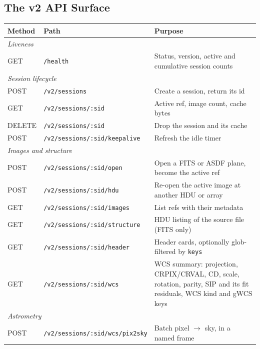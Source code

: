 \documentclass[11pt,a4paper]{article}
\newcommand{\code}[1]{\texttt{\small #1}}
\begin{document}
    \subsection{The v2 API Surface}

    \begin{table}[H]
        \centering
        \small
        \begin{tabularx}{\textwidth}{llX}
            \toprule
            \textbf{Method} & \textbf{Path} & \textbf{Purpose} \\
            \midrule
            \multicolumn{3}{l}{\textit{Liveness}} \\
            GET & \code{/health} & Status, version, active and cumulative session counts \\
            \midrule
            \multicolumn{3}{l}{\textit{Session lifecycle}} \\
            POST & \code{/v2/sessions} & Create a session, return its id \\
            GET & \code{/v2/sessions/:sid} & Active ref, image count, cache bytes \\
            DELETE & \code{/v2/sessions/:sid} & Drop the session and its cache \\
            POST & \code{/v2/sessions/:sid/keepalive} & Refresh the idle timer \\
            \midrule
            \multicolumn{3}{l}{\textit{Images and structure}} \\
            POST & \code{/v2/sessions/:sid/open} & Open a FITS or ASDF plane, become the active ref \\
            POST & \code{/v2/sessions/:sid/hdu} & Re-open the active image at another HDU or array \\
            GET & \code{/v2/sessions/:sid/images} & List refs with their metadata \\
            GET & \code{/v2/sessions/:sid/structure} & HDU listing of the source file (FITS only) \\
            GET & \code{/v2/sessions/:sid/header} & Header cards, optionally glob-filtered by \code{keys} \\
            GET & \code{/v2/sessions/:sid/wcs} & WCS summary: projection, CRPIX/CRVAL, CD, scale, rotation, parity, SIP and its fit residuals, WCS kind and gWCS keys \\
            \midrule
            \multicolumn{3}{l}{\textit{Astrometry}} \\
            POST & \code{/v2/sessions/:sid/wcs/pix2sky} & Batch pixel $\to$ sky, in a named frame \\

\end{tabularx}
\end{table}
\end{document}
